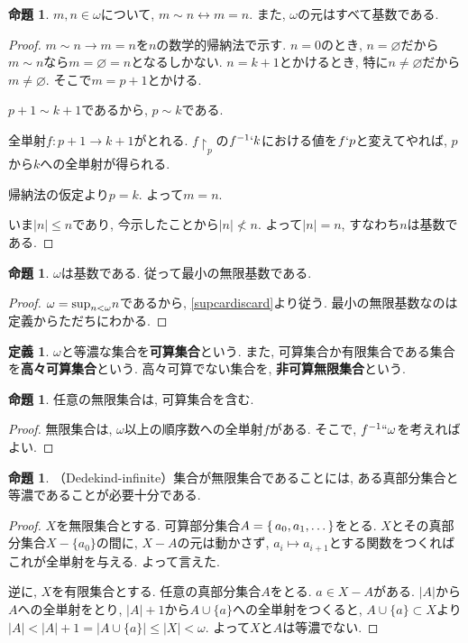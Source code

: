 \documentclass[a4paper, twoside]{bxjsarticle}
\newcommand{\abs}[1]{\left\lvert#1\right\rvert}
\theoremstyle{definition}
\newtheorem{prop}[thm]{命題}
\newtheorem{defn}[thm]{定義}
\begin{document}
        \begin{prop}
            $m, n\in\omega$について, $m\sim n \leftrightarrow m=n$. また, $\omega$の元はすべて基数である.
        \end{prop}
        \begin{proof}
            $m\sim n\to m=n$を$n$の数学的帰納法で示す. $n=0$のとき, $n=\varnothing$だから$m\sim n$なら$m=\varnothing=n$となるしかない. $n=k+1$とかけるとき, 特に$n\neq\varnothing$だから$m\neq\varnothing$. そこで$m=p+1$とかける. 
        
            $p+1\sim k+1$であるから, $p\sim k$である.
            \begin{framed}
                全単射$f\colon p+1\to k+1$がとれる. $f\restriction_p$の$f^{-1}`k$における値を$f`p$と変えてやれば, $p$から$k$への全単射が得られる.
            \end{framed}
            帰納法の仮定より$p=k$. よって$m=n$.
            
            いま$\abs{n}\leq n$であり, 今示したことから$\abs{n}\not<n$. よって$\abs{n}=n$, すなわち$n$は基数である.
        \end{proof}
        \begin{prop}
            $\omega$は基数である. 従って最小の無限基数である.
        \end{prop}
        \begin{proof}
        $\omega = {\rm sup}_{n<\omega}n$であるから, \ref{supcardiscard}より従う. 
        最小の無限基数なのは定義からただちにわかる.
        \end{proof}
        \begin{defn}
            $\omega$と等濃な集合を\textbf{可算集合}という. また, 可算集合か有限集合である集合を\textbf{高々可算集合}という. 高々可算でない集合を, \textbf{非可算無限集合}という.
        \end{defn}
        \begin{prop}
            任意の無限集合は, 可算集合を含む.
        \end{prop}
        \begin{proof}
            無限集合は, $\omega$以上の順序数への全単射$f$がある. そこで, $f^{-1}``\omega$を考えればよい.
        \end{proof}
        \begin{prop}
            （Dedekind-infinite）集合が無限集合であることには, ある真部分集合と等濃であることが必要十分である.
        \end{prop}
        \begin{proof}
            $X$を無限集合とする. 可算部分集合$A=\set{a_0, a_1, \dots}$をとる. $X$とその真部分集合$X-\{a_0\}$の間に, $X-A$の元は動かさず, $a_i\mapsto a_{i+1}$とする関数をつくればこれが全単射を与える. よって言えた.
            
            逆に, $X$を有限集合とする. 任意の真部分集合$A$をとる. $a\in X-A$がある. $\abs{A}$から$A$への全単射をとり, $\abs{A}+1$から$A\cup\{a\}$への全単射をつくると, $A\cup\{a\}\subset X$より$\abs{A}<\abs{A}+1=\abs{A\cup\{a\}}\leq\abs{X}<\omega$. よって$X$と$A$は等濃でない. 
        \end{proof}
\end{document}
